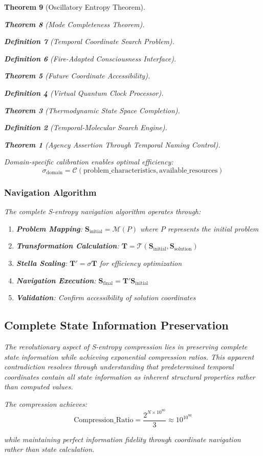 \documentclass[12pt,a4paper]{article}
\newtheorem{theorem}{Theorem}[section]
\newtheorem{definition}[theorem]{Definition}
\begin{document}
\begin{theorem}[Oscillatory Entropy Theorem]
\begin{theorem}[Mode Completeness Theorem]
\begin{enumerate}
\begin{definition}[Temporal Coordinate Search Problem]
\begin{algorithm}
\begin{definition}[Fire-Adapted Consciousness Interface]
\begin{theorem}[Future Coordinate Accessibility]
\begin{definition}[Virtual Quantum Clock Processor]
\begin{itemize}
\begin{itemize}
\begin{theorem}[Thermodynamic State Space Completion]
\begin{definition}[Temporal-Molecular Search Engine]
\begin{theorem}[Agency Assertion Through Temporal Naming Control]
\begin{remark}
Domain-specific calibration enables optimal efficiency:
$$\sigma_{\text{domain}} = \mathcal{C}(\text{problem\_characteristics}, \text{available\_resources})$$

\subsubsection{Navigation Algorithm}

The complete S-entropy navigation algorithm operates through:

\begin{enumerate}
\item \textbf{Problem Mapping}: $\mathbf{S}_{\text{initial}} = \mathcal{M}(P)$ where $P$ represents the initial problem
\item \textbf{Transformation Calculation}: $\mathbf{T} = \mathcal{T}(\mathbf{S}_{\text{initial}}, \mathbf{S}_{\text{solution}})$
\item \textbf{Stella Scaling}: $\mathbf{T}' = \sigma \mathbf{T}$ for efficiency optimization
\item \textbf{Navigation Execution}: $\mathbf{S}_{\text{final}} = \mathbf{T}' \mathbf{S}_{\text{initial}}$
\item \textbf{Validation}: Confirm accessibility of solution coordinates
\end{enumerate}

\subsection{Complete State Information Preservation}

The revolutionary aspect of S-entropy compression lies in preserving complete state information while achieving exponential compression ratios. This apparent contradiction resolves through understanding that predetermined temporal coordinates contain all state information as inherent structural properties rather than computed values.

The compression achieves:
$$\text{Compression\_Ratio} = \frac{2^{N \times 10^{80}}}{3} \approx 10^{10^{80}}$$

while maintaining perfect information fidelity through coordinate navigation rather than state calculation.


\end{remark}
\end{theorem}
\end{definition}
\end{theorem}
\end{itemize}
\end{itemize}
\end{definition}
\end{theorem}
\end{definition}
\end{algorithm}
\end{definition}
\end{enumerate}
\end{theorem}
\end{theorem}
\end{document}
